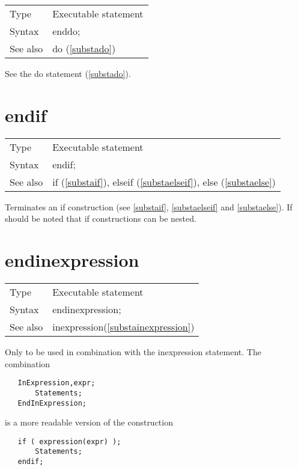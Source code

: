 \noindent \begin{tabular}{ll}
Type & Executable statement\\
Syntax & enddo;
\\ See also & do (\ref{substado})
\end{tabular} \vspace{4mm}

See the do statement (\ref{substado}).
\vspace{10mm}


\section{endif}
\label{substaendif}

\noindent \begin{tabular}{ll}
Type & Executable statement\\
Syntax & endif;
\\ See also & if (\ref{substaif}),
              elseif (\ref{substaelseif}),
              else (\ref{substaelse})
\end{tabular} \vspace{4mm}

\noindent Terminates an if construction (see \ref{substaif}, 
\ref{substaelseif} and \ref{substaelse}). If should be noted that 
if 
constructions can be nested.
\vspace{10mm}

 
\section{endinexpression}
\label{substaendinexpression}

\noindent \begin{tabular}{ll}
Type & Executable statement\\
Syntax & endinexpression;
\\ See also & inexpression(\ref{substainexpression})
\end{tabular} \vspace{4mm}

\noindent Only to be used in combination with the 
inexpression statement. The 
combination
\begin{verbatim}
   InExpression,expr;
       Statements;
   EndInExpression;
\end{verbatim}
is a more readable version of the construction
\begin{verbatim}
   if ( expression(expr) );
       Statements;
   endif;
\end{verbatim}
\vspace{10mm}


